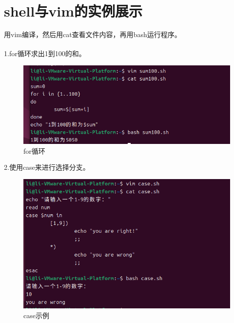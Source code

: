 \documentclass[a4paper, 12pt]{article}
\begin{document}
\newpage

\section{shell与vim的实例展示}

{\color{red}用vim编译，然后用cat查看文件内容，再用bash运行程序。}
\\
\\
1.for循环求出1到100的和。
\begin{figure}[H]
  \centering
  \includegraphics[width=1\textwidth]{屏幕截图 2024-08-31 120440.png}
  \caption{for循环}
    \end{figure}


2.使用case来进行选择分支。
\begin{figure}[H]
  \centering
  \includegraphics[width=1\textwidth]{屏幕截图 2024-08-31 120922.png}
  \caption{case示例}
    \end{figure}
\\
\end{document}
